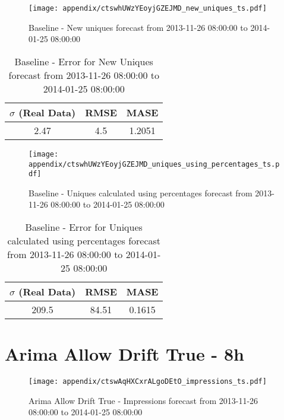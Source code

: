 \begin{figure}[H] \begin{center} \leavevmode
\texttt{[image: appendix/ctswhUWzYEoyjGZEJMD\_new\_uniques\_ts.pdf]} \caption{
Baseline - New uniques forecast from 2013-11-26 08:00:00 to 2014-01-25 08:00:00} \label{fig:appendix/ctswhUWzYEoyjGZEJMD_new_uniques_ts.pdf} \end{center}
\end{figure}

\begin{table}[H]
\centering
\footnotesize
\begin{tabular}{ccc}
$\sigma$ (Real Data) & RMSE & MASE   \\ \hline
2.47 & 4.5 & 1.2051 \\
\end{tabular}

\vspace{0.5cm}

\caption{
Baseline - Error for New Uniques forecast from 2013-11-26 08:00:00 to 2014-01-25 08:00:00}
\end{table}

\begin{figure}[H] \begin{center} \leavevmode
\texttt{[image: appendix/ctswhUWzYEoyjGZEJMD\_uniques\_using\_percentages\_ts.pdf]} \caption{
Baseline - Uniques calculated using percentages forecast from 2013-11-26 08:00:00 to 2014-01-25 08:00:00} \label{fig:appendix/ctswhUWzYEoyjGZEJMD_uniques_using_percentages_ts.pdf} \end{center}
\end{figure}

\begin{table}[H]
\centering
\footnotesize
\begin{tabular}{ccc}
$\sigma$ (Real Data) & RMSE & MASE   \\ \hline
209.5 & 84.51 & 0.1615 \\
\end{tabular}

\vspace{0.5cm}

\caption{
Baseline - Error for Uniques calculated using percentages forecast from 2013-11-26 08:00:00 to 2014-01-25 08:00:00}
\end{table}

\section{Arima Allow Drift True - 8h}
\begin{figure}[H] \begin{center} \leavevmode
\texttt{[image: appendix/ctswAqHXCxrALgoDEtO\_impressions\_ts.pdf]} \caption{
Arima Allow Drift True - Impressions forecast from 2013-11-26 08:00:00 to 2014-01-25 08:00:00} \label{fig:appendix/ctswAqHXCxrALgoDEtO_impressions_ts.pdf} \end{center}
\end{figure}

